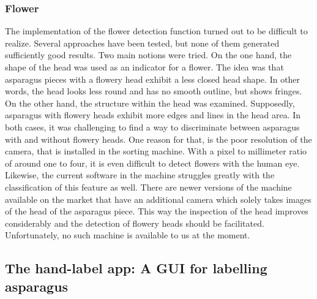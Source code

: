 \subsubsection{Flower}

The implementation of the flower detection function turned out to be difficult to realize. Several approaches have been tested, but none of them generated sufficiently good results. Two main notions were tried. On the one hand, the shape of the head was used as an indicator for a flower. The idea was that asparagus pieces with a flowery head exhibit a less closed head shape. In other words, the head looks less round and has no smooth outline, but shows fringes. On the other hand, the structure within the head was examined. Supposedly, asparagus with flowery heads exhibit more edges and lines in the head area. In both cases, it was challenging to find a way to discriminate between asparagus with and without flowery heads. One reason for that, is the poor resolution of the camera, that is installed in the sorting machine. With a pixel to millimeter ratio of around one to four, it is even difficult to detect flowers with the human eye. Likewise, the current software in the machine struggles greatly with the classification of this feature as well. There are newer versions of the machine available on the market that have an additional camera which solely takes images of the head of the asparagus piece. This way the inspection of the head improves considerably and the detection of flowery heads should be facilitated. Unfortunately, no such machine is available to us at the moment.


\subsection{The hand-label app: A GUI for labelling asparagus}

